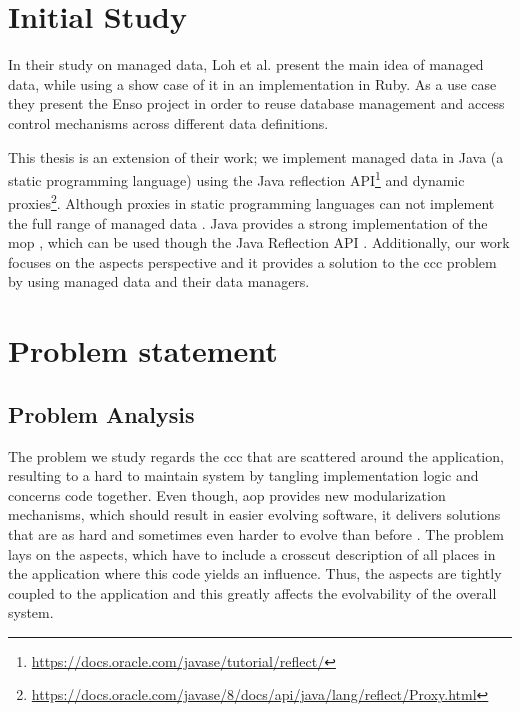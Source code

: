 \section{Initial Study}\label{Initial Study}
In their study on managed data, Loh et al. \cite{loh2012managed} present the main idea of managed data, while using a show case of it in an implementation in Ruby. As a use case they present the Enso project in order to reuse database management and  access control mechanisms across different data definitions.

This thesis is an extension of their work; we implement managed data in Java (a static programming language) using the Java reflection API\footnote{\url{https://docs.oracle.com/javase/tutorial/reflect/}} and dynamic proxies\footnote{\url{https://docs.oracle.com/javase/8/docs/api/java/lang/reflect/Proxy.html}}. 
Although proxies in static programming languages can not implement the full range of managed data \cite{loh2012managed}. 
Java provides a strong implementation of the \ac{mop} \cite{kiczales1991art}, which can be used though the Java Reflection API \cite{forman2004java}. 
Additionally, our work focuses on the aspects perspective and it provides a solution to the \ac{ccc} problem by using managed data
and their data managers.

\section{Problem statement}\label{Problem statement}

\subsection{Problem Analysis}\label{Problem Analysis}

The problem we study regards the \ac{ccc} that are scattered around the application, resulting to a hard to maintain system 
by tangling implementation logic and concerns code together.
Even though, \ac{aop} provides new modularization mechanisms, which should result in easier evolving software, 
it delivers solutions that are as hard and sometimes even harder to evolve than before \cite{tourwe2003existence}. 
The problem lays on the aspects, which have to include a crosscut description of all places in the application where this code yields an influence. 
Thus, the aspects are tightly coupled to the application and this greatly affects the evolvability of the overall system. 

